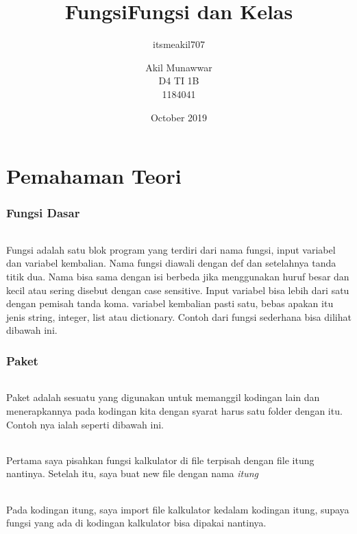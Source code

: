 \documentclass{article}
\title{Fungsi}
\author{itsmeakil707 }
\date{October 2019}
\begin{document}
\title{Fungsi dan Kelas}
\author{Akil Munawwar \\ D4 TI 1B \\ 1184041}
\maketitle

\part{Pemahaman Teori}
\section{Fungsi Dasar}
\paragraph{}
Fungsi adalah satu blok program yang terdiri dari nama fungsi, input variabel dan variabel kembalian. Nama fungsi diawali dengan def dan setelahnya tanda titik dua. Nama bisa sama dengan isi berbeda jika menggunakan huruf besar dan kecil atau sering disebut dengan case sensitive. Input variabel bisa lebih dari satu dengan pemisah tanda koma. variabel kembalian pasti satu, bebas apakan itu jenis string, integer, list atau dictionary. Contoh dari fungsi sederhana bisa dilihat dibawah ini.


\newpage
\section{Paket}
\paragraph{}
Paket adalah sesuatu yang digunakan untuk memanggil kodingan lain dan menerapkannya pada kodingan kita dengan syarat harus satu folder dengan itu. Contoh nya ialah seperti dibawah ini.

\paragraph{}
Pertama saya pisahkan fungsi kalkulator di file terpisah dengan file itung nantinya. Setelah itu, saya buat new file dengan nama \textit{itung}

\paragraph{}
Pada kodingan itung, saya import file kalkulator kedalam kodingan itung, supaya fungsi yang ada di kodingan kalkulator bisa dipakai nantinya.
\newpage
\end{document}
